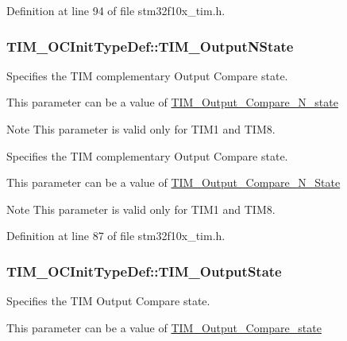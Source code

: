 Definition at line 94 of file stm32f10x\-\_\-tim.\-h.

\hypertarget{struct_t_i_m___o_c_init_type_def_a933904d2f892d0b945a908b9257fe869}{
\subsubsection[{T\-I\-M\-\_\-\-Output\-N\-State}]{ T\-I\-M\-\_\-\-O\-C\-Init\-Type\-Def\-::\-T\-I\-M\-\_\-\-Output\-N\-State}}\label{struct_t_i_m___o_c_init_type_def_a933904d2f892d0b945a908b9257fe869}
\begin{DoxyVerb}  Specifies the TIM complementary Output Compare state.
\end{DoxyVerb}
 This parameter can be a value of \hyperlink{group___t_i_m___output___compare___n__state}{T\-I\-M\-\_\-\-Output\-\_\-\-Compare\-\_\-\-N\-\_\-state} \begin{DoxyNote}{Note}
This parameter is valid only for T\-I\-M1 and T\-I\-M8.
\end{DoxyNote}
\begin{DoxyVerb}  Specifies the TIM complementary Output Compare state.
\end{DoxyVerb}
 This parameter can be a value of \hyperlink{group___t_i_m___output___compare___n___state}{T\-I\-M\-\_\-\-Output\-\_\-\-Compare\-\_\-\-N\-\_\-\-State} \begin{DoxyNote}{Note}
This parameter is valid only for T\-I\-M1 and T\-I\-M8. 
\end{DoxyNote}


Definition at line 87 of file stm32f10x\-\_\-tim.\-h.

\hypertarget{struct_t_i_m___o_c_init_type_def_a2baca9c02d214d3125635a74e8d9aee4}{
\subsubsection[{T\-I\-M\-\_\-\-Output\-State}]{ T\-I\-M\-\_\-\-O\-C\-Init\-Type\-Def\-::\-T\-I\-M\-\_\-\-Output\-State}}\label{struct_t_i_m___o_c_init_type_def_a2baca9c02d214d3125635a74e8d9aee4}
\begin{DoxyVerb}   Specifies the TIM Output Compare state.
\end{DoxyVerb}
 This parameter can be a value of \hyperlink{group___t_i_m___output___compare__state}{T\-I\-M\-\_\-\-Output\-\_\-\-Compare\-\_\-state}

